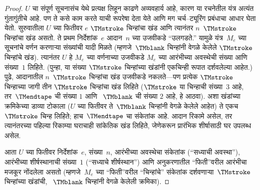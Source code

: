 \begin{proof}
  $U$ चा संपूर्ण सूचनासंच येथे प्रत्यक्ष लिहून काढणे अव्यवहार्य आहे, कारण
  या रचनेतील यंत्र अत्यंत गुंतागुंतीचे आहे. पण ते कसे
  काम करते याची रूपरेषा देता येते आणि मग
  चर्च--ट्यूरिंग प्रबंधाचा आधार घेता येतो.
  सुरुवातीला $U$ च्या फितीवर $e$ $\TMstroke$
  चिन्हांचा खंड आणि त्यानंतर $n$~$\TMstroke$
  चिन्हांचा खंड असतो. ते प्रथम निर्देशांक~$e$
  आदान~$n$ च्या उजवीकडे “उलगडते.” यामुळे
  यंत्र~$M_e$ च्या सूचनांचे वर्णन करणाऱ्या
  संख्यांची यादी मिळते (म्हणजे~$\TMblank$
  चिन्हांनी वेगळे केलेले $\TMstroke$ चिन्हांचे
  खंड). त्यानंतर $U$ हे $M_e$ च्या वर्णनाच्या
  उजवीकडे $M_e$ च्या आरंभीच्या अवस्थेची
  संख्या आणि संख्या~$1$ लिहिते. (पुन्हा,
  या संख्या $\TMstroke$ चिन्हांच्या खंडांनी
  एकचिन्ही रूपात दर्शवलेल्या आहेत.) पुढे,
  आदानातील $n$~$\TMstroke$ चिन्हांचा खंड
  उजवीकडे नकलते---पण प्रत्येक $\TMstroke$
  चिन्हाच्या जागी तीन $\TMstroke$ चिन्हांचा
  खंड लिहिते ($\TMstroke$ या चिन्हाची संख्या~$3$
  आहे, तर~$\TMendtape$ ची संख्या $1$ आणि
  ~$\TMblank$ ची संख्या $2$ आहे, हे आठवा).
  अशा खंडांच्या क्रमिकेच्या डाव्या टोकाला
  ($U$ च्या फितीवर ते~$\TMblank$ चिन्हांनी
  वेगळे केलेले आहेत) ते एकच~$\TMstroke$
  चिन्ह लिहिते; हाच~$\TMendtape$ चा संकेतांक आहे.
  आदान रिकामे असेल, तर त्यानंतरच्या पहिल्या रिकाम्या घराचाही
  सांकेतिक खंड लिहिते, जेणेकरून प्रारंभिक शीर्षासाठी घर उपलब्ध असेल.

  आता $U$ च्या फितीवर निर्देशांक~$e$, संख्या~$n$,
  आरंभीच्या अवस्थेचा संकेतांक (“सध्याची अवस्था”),
  आरंभीच्या शीर्षस्थानाची संख्या~$1$
  (“सध्याचे शीर्षस्थान”) आणि अनुकरणातील
  “फिती”वरील आरंभीचा मजकूर नोंदलेला असतो
  (म्हणजे~$M_e$ च्या “फिती”वरील “चिन्हांचे”
  संकेतांक दर्शवणाऱ्या~$\TMstroke$ चिन्हांच्या
  खंडांची, ~$\TMblank$ चिन्हांनी वेगळे केलेली
  क्रमिका).


\end{proof}
